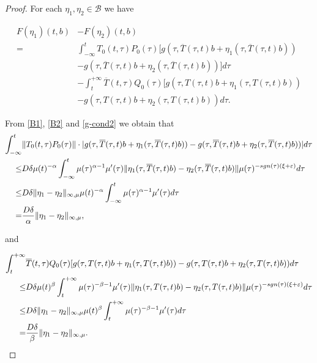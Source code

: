 \documentclass[10pt,a4paper]{amsart}
\begin{document}
\begin{proof}
For each $\eta_1, \eta_2\in\mathcal{B}$ we have

    \begin{equation*}
        \begin{split}
        F(\eta_1)(t,b) &- F(\eta_2)(t,b)\\
        =& \int_{-\infty}^{t}T_0(t,\tau)P_0(\tau)[g(\tau,\overline{T}(\tau,t)b+\eta_1(\tau,\overline{T}(\tau,t)b))\\
        &- g(\tau,\overline{T}(\tau,t)b+\eta_2(\tau,\overline{T}(\tau,t)b))]d\tau\\
        &- \int_{t}^{+\infty}\overline{T}(t,\tau)Q_0(\tau)[g(\tau,T(\tau,t)b+\eta_1(\tau,T(\tau,t)b))\\
        &-g(\tau,T(\tau,t)b+\eta_2(\tau,T(\tau,t)b))d\tau.
    \end{split}
    \end{equation*}

    From \eqref{B1}, \eqref{B2} and \eqref{g-cond2} we obtain that
\begin{equation*}
    \begin{split}
        \int_{-\infty}^{t}&\|T_0(t,\tau)P_0(\tau)\|\cdot|g(\tau,\overline{T}(\tau,t)b+\eta_1(\tau,\overline{T}(\tau,t)b))- g(\tau,\overline{T}(\tau,t)b+\eta_2(\tau,\overline{T}(\tau,t)b))|d\tau\\
        \leq & D\delta\mu(t)^{-\alpha}\int_{-\infty}^{t}\mu(\tau)^{\alpha-1}\mu'(\tau)\|\eta_1(\tau,\overline{T}(\tau,t)b) - \eta_2(\tau,\overline{T}(\tau,t)b)\|\mu(\tau)^{-\textnormal{sgn}(\tau)(\xi+\varepsilon)}d\tau\\
        \leq & D\delta\|\eta_1-\eta_2\|_{\infty,\mu}\mu(t)^{-\alpha}\int_{-\infty}^{t}\mu(\tau)^{\alpha-1}\mu'(\tau)d\tau\\
        =& \frac{D\delta}{\alpha}\|\eta_1-\eta_2\|_{\infty,\mu},
    \end{split}
\end{equation*}

and

\begin{equation*}
    \begin{split}
        \int_{t}^{+\infty}&\overline{T}(t,\tau)Q_0(\tau)[g(\tau,T(\tau,t)b+\eta_1(\tau,T(\tau,t)b))
        -g(\tau,T(\tau,t)b+\eta_2(\tau,T(\tau,t)b))d\tau\\
        \leq & D\delta\mu(t)^{\beta}\int_{t}^{+\infty}\mu(\tau)^{-\beta-1}\mu'(\tau)\|\eta_1(\tau,T(\tau,t)b) - \eta_2(\tau,T(\tau,t)b)\|\mu(\tau)^{-\textnormal{sgn}(\tau)(\xi+\varepsilon)}d\tau\\
        \leq & D\delta\|\eta_1-\eta_2\|_{\infty,\mu}\mu(t)^{\beta}\int_{t}^{+\infty}\mu(\tau)^{-\beta-1}\mu'(\tau)d\tau\\
        =& \frac{D\delta}{\beta}\|\eta_1-\eta_2\|_{\infty,\mu}.
    \end{split}
\end{equation*}


\end{proof}
\end{document}
